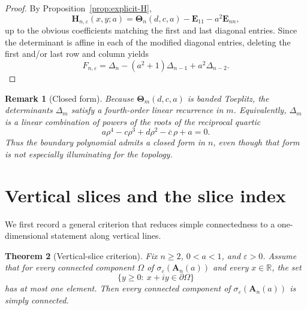 \documentclass[11pt]{article}
\newtheorem{theorem}{Theorem}[section]
\newtheorem{remark}[theorem]{Remark}
\newcommand{\R}{\mathbb{R}}
\begin{document}
\begin{proof}
By Proposition~\ref{prop:explicit-H},
\[
\mathbf H_{n,\varepsilon}(x,y;a)
=
\mathbf\Theta_n(d,c,a)-\mathbf E_{11}-a^2\mathbf E_{nn},
\]
up to the obvious coefficients matching the first and last diagonal entries. Since the determinant is affine in each of the modified diagonal entries, deleting the first and/or last row and column yields
\[
F_{n,\varepsilon}
=
\Delta_n-(a^2+1)\Delta_{n-1}+a^2\Delta_{n-2}.
\]
\end{proof}

\begin{remark}[Closed form]\label{rem:quartic}
Because \(\mathbf\Theta_m(d,c,a)\) is banded Toeplitz, the determinants \(\Delta_m\) satisfy a fourth-order linear recurrence in \(m\). Equivalently, \(\Delta_m\) is a linear combination of powers of the roots of the reciprocal quartic
\[
a\rho^4-c\rho^3+d\rho^2-\overline c\,\rho+a=0.
\]
Thus the boundary polynomial admits a closed form in \(n\), even though that form is not especially illuminating for the topology.
\end{remark}

\section{Vertical slices and the slice index}

We first record a general criterion that reduces simple connectedness to a one-dimensional statement along vertical lines.

\begin{theorem}[Vertical-slice criterion]\label{thm:vertical-slice}
Fix \(n\ge 2\), \(0<a<1\), and \(\varepsilon>0\). Assume that for every connected component \(\Omega\) of \(\sigma_\varepsilon(\mathbf A_n(a))\) and every \(x\in\R\), the set
\[
\{y\ge 0:\ x+iy\in \partial\Omega\}
\]
has at most one element. Then every connected component of \(\sigma_\varepsilon(\mathbf A_n(a))\) is simply connected.
\end{theorem}
\end{document}
